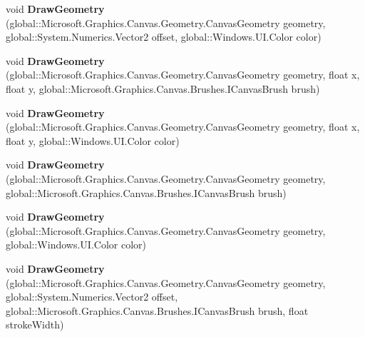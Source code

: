\begin{DoxyCompactItemize}
void {\bfseries Draw\+Geometry} (global\+::\+Microsoft.\+Graphics.\+Canvas.\+Geometry.\+Canvas\+Geometry geometry, global\+::\+System.\+Numerics.\+Vector2 offset, global\+::\+Windows.\+U\+I.\+Color color)
\item 
\mbox{\label{class_microsoft_1_1_graphics_1_1_canvas_1_1_canvas_drawing_session_a48eb0c334ababf8c3716b45c569c3005}} 
void {\bfseries Draw\+Geometry} (global\+::\+Microsoft.\+Graphics.\+Canvas.\+Geometry.\+Canvas\+Geometry geometry, float x, float y, global\+::\+Microsoft.\+Graphics.\+Canvas.\+Brushes.\+I\+Canvas\+Brush brush)
\item 
\mbox{\label{class_microsoft_1_1_graphics_1_1_canvas_1_1_canvas_drawing_session_a57643b455bab22b3fe9e8d78f470fcdb}} 
void {\bfseries Draw\+Geometry} (global\+::\+Microsoft.\+Graphics.\+Canvas.\+Geometry.\+Canvas\+Geometry geometry, float x, float y, global\+::\+Windows.\+U\+I.\+Color color)
\item 
\mbox{\label{class_microsoft_1_1_graphics_1_1_canvas_1_1_canvas_drawing_session_a4a1e501e8250e1c79e77a5161344cdd1}} 
void {\bfseries Draw\+Geometry} (global\+::\+Microsoft.\+Graphics.\+Canvas.\+Geometry.\+Canvas\+Geometry geometry, global\+::\+Microsoft.\+Graphics.\+Canvas.\+Brushes.\+I\+Canvas\+Brush brush)
\item 
\mbox{\label{class_microsoft_1_1_graphics_1_1_canvas_1_1_canvas_drawing_session_a5a2b8f162f82d4372e8b03282c459d40}} 
void {\bfseries Draw\+Geometry} (global\+::\+Microsoft.\+Graphics.\+Canvas.\+Geometry.\+Canvas\+Geometry geometry, global\+::\+Windows.\+U\+I.\+Color color)
\item 
\mbox{\label{class_microsoft_1_1_graphics_1_1_canvas_1_1_canvas_drawing_session_ae9bcaec580062c76649917b8be272f72}} 
void {\bfseries Draw\+Geometry} (global\+::\+Microsoft.\+Graphics.\+Canvas.\+Geometry.\+Canvas\+Geometry geometry, global\+::\+System.\+Numerics.\+Vector2 offset, global\+::\+Microsoft.\+Graphics.\+Canvas.\+Brushes.\+I\+Canvas\+Brush brush, float stroke\+Width)
\item 

\end{DoxyCompactItemize}
